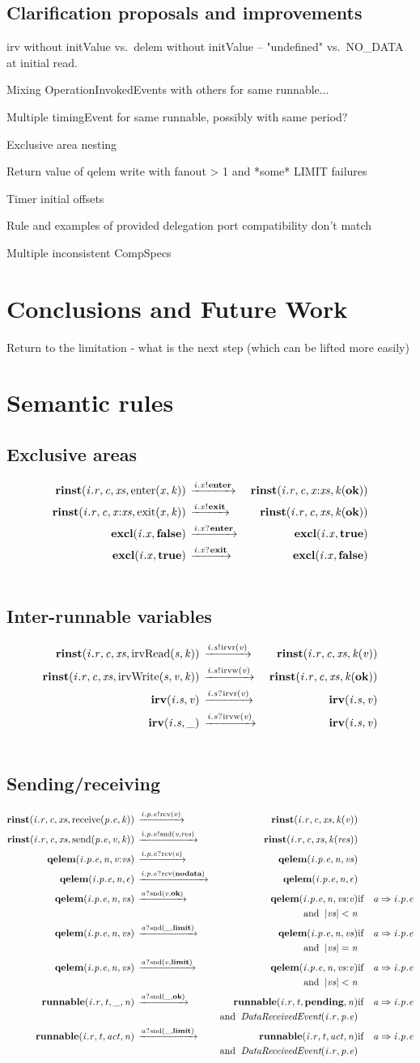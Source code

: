 \documentclass[twocolumn]{article}
\begin{document}
\subsection{Clarification proposals and improvements}
\label{sec:DiscImp}

irv without initValue vs.\ delem without initValue -- "undefined" vs.\ NO\_DATA at initial read.

Mixing OperationInvokedEvents with others for same runnable...

Multiple timingEvent for same runnable, possibly with same period?

Exclusive area nesting

Return value of qelem write with fanout > 1 and *some* LIMIT failures

Timer initial offsets

Rule and examples of provided delegation port compatibility don't match

Multiple inconsistent CompSpecs


\section{Conclusions and Future Work}
\label{sec:Conc}

Return to the limitation - what is the next step (which can be lifted more easily)

\onecolumn
\appendix
\section{Semantic rules}
\label{sec:Prolog}

\subsection{Exclusive areas}
\begin{eqnarray}      \ExclusiveAreas          \notag \end{eqnarray}

\subsection{Inter-runnable variables}
\begin{eqnarray}      \InterrunnableVariables  \notag \end{eqnarray}

\subsection{Sending/receiving}
\begin{eqnarray}      \SendingReceiving        \notag \end{eqnarray}
\end{document}
